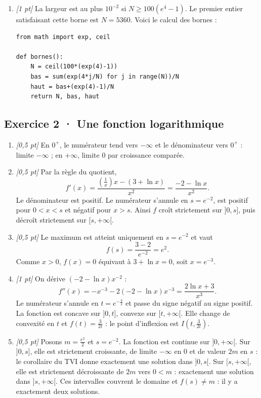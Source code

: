 \begin{enumerate}

\item \textit{[1 pt]} La largeur est au plus $10^{-2}$ si $N\ge100(e^{4}-1)$. Le premier entier satisfaisant cette borne est $N=5360$. Voici le calcul des bornes :
\begin{lstlisting}
from math import exp, ceil

def bornes():
    N = ceil(100*(exp(4)-1))
    bas = sum(exp(4*j/N) for j in range(N))/N
    haut = bas+(exp(4)-1)/N
    return N, bas, haut
\end{lstlisting}


\end{enumerate}

\subsection*{Exercice 2 · Une fonction logarithmique}\begin{enumerate}

\item \textit{[0{,}5 pt]} En $0^+$, le numérateur tend vers $-\infty$ et le dénominateur vers $0^+$ : limite $-\infty$ ; en $+\infty$, limite $0$ par croissance comparée.

\item \textit{[0{,}5 pt]} Par la règle du quotient,
\[f'(x)=\frac{(\frac{1}{x})x-(3+\ln x)}{x^2}=\frac{-2-\ln x}{x^2}.\]
Le dénominateur est positif. Le numérateur s'annule en $s=e^{-2}$, est positif pour $0<x<s$ et négatif pour $x>s$. Ainsi $f$ croît strictement sur $]0,s]$, puis décroît strictement sur $[s,+\infty[$.

\item \textit{[0{,}5 pt]} Le maximum est atteint uniquement en $s=e^{-2}$ et vaut
\[f(s)=\frac{3- 2}{e^{-2}}=e^{2}.\]
Comme $x>0$, $f(x)=0$ équivaut à $3+\ln x=0$, soit $x=e^{-3}$.

\item \textit{[1 pt]} On dérive $(-2-\ln x)x^{-2}$ :
\[f''(x)=-x^{-3}-2(-2-\ln x)x^{-3}=\frac{2\ln x+3}{x^3}.\]
Le numérateur s'annule en $t=e^{-\frac{3}{2}}$ et passe du signe négatif au signe positif. La fonction est concave sur $]0,t]$, convexe sur $[t,+\infty[$. Elle change de convexité en $t$ et $f(t)=\frac{3}{2t}$ : le point d'inflexion est $I(t,\frac{3}{2t})$.

\item \textit{[0{,}5 pt]} Posons $m=\frac{e^{2}}{2}$ et $s=e^{-2}$. La fonction est continue sur $]0,+\infty[$. Sur $]0,s]$, elle est strictement croissante, de limite $-\infty$ en $0$ et de valeur $2m$ en $s$ : le corollaire du TVI donne exactement une solution dans $]0,s[$. Sur $[s,+\infty[$, elle est strictement décroissante de $2m$ vers $0<m$ : exactement une solution dans $]s,+\infty[$. Ces intervalles couvrent le domaine et $f(s)\ne m$ : il y a exactement deux solutions.


\end{enumerate}
